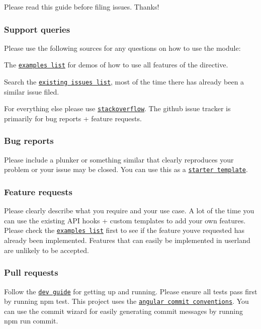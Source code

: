 Please read this guide before filing issues. Thanks!

\subsubsection*{Support queries}

Please use the following sources for any questions on how to use the module\+:
\begin{DoxyItemize}
\item The \href{http://mattlewis92.github.io/angular-bootstrap-calendar/}{\tt examples list} for demos of how to use all features of the directive.
\item Search the \href{https://github.com/mattlewis92/angular-bootstrap-calendar/issues?q=is%3Aissue+is%3Aclosed}{\tt existing issues list}, most of the time there has already been a similar issue filed.
\item For everything else please use \href{http://stackoverflow.com/questions/ask/advice}{\tt stackoverflow}. The github issue tracker is primarily for bug reports + feature requests.
\end{DoxyItemize}

\subsubsection*{Bug reports}

Please include a plunker or something similar that clearly reproduces your problem or your issue may be closed. You can use this as a \href{http://plnkr.co/edit/tursHHxWA8SdALaj0Bx6?p=preview}{\tt starter template}.

\subsubsection*{Feature requests}

Please clearly describe what you require and your use case. A lot of the time you can use the existing A\+PI hooks + custom templates to add your own features. Please check the \href{http://mattlewis92.github.io/angular-bootstrap-calendar/}{\tt examples list} first to see if the feature you\textquotesingle{}ve requested has already been implemented. Features that can easily be implemented in userland are unlikely to be accepted.

\subsubsection*{Pull requests}

Follow the \href{https://github.com/mattlewis92/angular-bootstrap-calendar#development}{\tt dev guide} for getting up and running. Please ensure all tests pass first by running {\ttfamily npm test}. This project uses the \href{https://github.com/angular/angular.js/blob/master/CONTRIBUTING.md#commit-message-format}{\tt angular commit conventions}. You can use the commit wizard for easily generating commit messages by running {\ttfamily npm run commit}. 